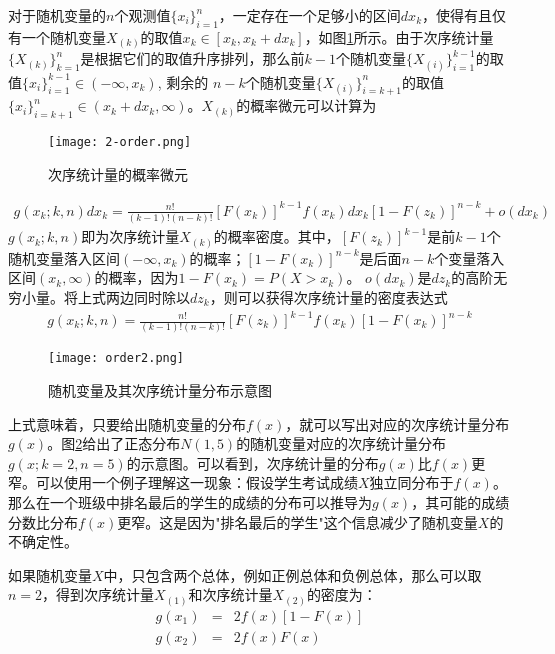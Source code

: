 对于随机变量的$n$个观测值$\{x_i\}_{i=1}^n$，一定存在一个足够小的区间$dx_k$，使得有且仅有一个随机变量$X_{(k)}$的取值$x_k \in [x_k, x_k+dx_k]$，如图\ref{Fig:order}所示。由于次序统计量$\{X_{(k)}\}_{k=1}^n$是根据它们的取值升序排列，那么前$k-1$个随机变量$\{X_{(i)}\}_{i=1}^{k-1}$的取值$\{x_i\}_{i=1}^{k-1} \in (- \infty ,{x_k})$, 剩余的 $n-k$个随机变量$\{X_{(i)}\}_{i={k+1}}^{n}$的取值$\{x_{i}\}_{i=k+1}^n \in ({x_k} + d{x_k},\infty )$。$X_{(k)}$的概率微元可以计算为
\begin{figure}[!t]
	\centering
	\texttt{[image: 2-order.png]}
	\caption{次序统计量的概率微元}
	\label{Fig:order}
\end{figure}
\begin{equation}\label{Eq:ProbDiff}
	\begin{aligned}
		g({x_k}; k,n)d{x_k} = \frac{{n!}}{{(k - 1)!(n - k)!}}{[F({x_k})]^{k - 1}} f({x_k})d{x_k}{[1 - F({z_k})]^{n - k}} + o(d{x_k}) \nonumber
	\end{aligned}
\end{equation}
$g({x_k}; k,n)$即为次序统计量$X_{(k)}$的概率密度。其中，${[F({z_k})]^{k - 1}}$是前$k-1$个随机变量落入区间$(- \infty ,{x_k})$的概率；${[1 - F({x_k})]^{n - k}}$是后面$n-k$个变量落入区间$({x_k},\infty )$的概率，因为$1 - F({x_k}) = P(X > {x_k})$。 $o(d{x_k})$是$d{z_k}$的高阶无穷小量。将上式两边同时除以$d{z_k}$，则可以获得次序统计量的密度表达式
\begin{equation}
	\begin{aligned}
g({x_k};k,n) =   \frac{{n!}}{{(k - 1)!(n - k)!}} {[F({z_k})]^{k - 1}}f({x_k}){[1 - F({x_k})]^{n - k}} \nonumber
	\end{aligned}
\end{equation}
\begin{figure}[!htbp]
	\centering
	\texttt{[image: order2.png]}
	\caption{随机变量及其次序统计量分布示意图}
	\label{Fig:order2}
\end{figure}
上式意味着，只要给出随机变量的分布$f(x)$，就可以写出对应的次序统计量分布$g(x)$。图\ref{Fig:order2}给出了正态分布$N(1,5)$的随机变量对应的次序统计量分布$g({x};k=2,n=5)$的示意图。可以看到，次序统计量的分布$g(x)$比$f(x)$更窄。可以使用一个例子理解这一现象：假设学生考试成绩$X$独立同分布于$f(x)$。那么在一个班级中排名最后的学生的成绩的分布可以推导为$g(x)$，其可能的成绩分数比分布$f(x)$更窄。这是因为"排名最后的学生"这个信息减少了随机变量$X$的不确定性。

如果随机变量$X$中，只包含两个总体，例如正例总体和负例总体，那么可以取$n=2$，得到次序统计量$X_{(1)}$和次序统计量$X_{(2)}$的密度为：
\begin{eqnarray}
g(x_1) &=& 2 f(x) [1-F(x)] \\
g(x_2)&=& 2 f(x)F(x)
\end{eqnarray}

